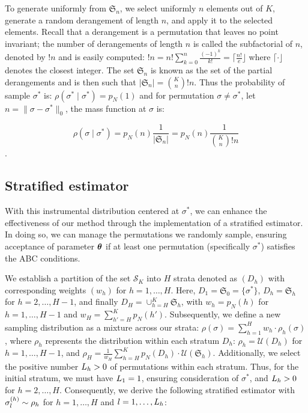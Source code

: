 To generate uniformly from $\mathfrak S_n$, we select uniformly $n$ elements out of $K$, generate a random derangement of length $n$, and apply it to the selected elements. Recall that a derangement is a permutation that leaves no point invariant; the number of derangements of length $n$ is called the subfactorial of $n$, denoted by $!n$ and is easily computed: $!n = n! \sum_{k=0}^n \frac{(-1)^k}{k!} = \lceil \frac{n!}{e} \rfloor$ where $\lceil \cdot \rfloor$ denotes the closest integer.
The set $\mathfrak{S}_n$ is known as the set of the partial derangements and is then such that $\lvert \mathfrak S_n \rvert = \binom{K}{n} !n$. 
Thus the probability of sample $\sigma^*$ is: $\rho(\sigma^*\mid \sigma^*) = p_N(1)$ and for  permutation $\sigma \neq \sigma^*$, let $n = \lVert\sigma - \sigma^*\rVert_0$,  the mass function at $\sigma$ is:

$$\rho(\sigma\mid\sigma^*) = p_N(n)\frac{1}{\lvert \mathfrak{S}_n \rvert} = p_N(n)\frac{1}{\binom{K}{n}!n}$$.

\subsection{Stratified estimator}
\label{appendix_secstrat}
With this instrumental distribution centered at $\sigma^*$, we can enhance the effectiveness of our method through the implementation of a stratified estimator. In doing so, we can manage the permutations we randomly sample, ensuring acceptance of parameter $\boldsymbol{\theta}$ if at least one permutation (specifically $\sigma^*$) satisfies the ABC conditions.

We establish a partition of the set $\mathcal S_K$ into $H$ strata denoted as $(D_h)$ with corresponding weights $(w_h)$ for $h=1,\dots,H$. Here, $D_1 = \mathfrak S_0 = \{ \sigma^* \}$, $D_h = \mathfrak S_h$ for $h = 2,\dots,H-1$, and finally $D_H = \cup_{h=H}^K \mathfrak S_h$, with $w_h = p_N(h)$ for $h=1,\dots,H-1$ and $w_H = \sum_{h'=H}^K p_N(h')$. Subsequently, we define a new sampling distribution as a mixture across our strata: $\rho(\sigma)= \sum_{h=1}^H w_h \cdot \rho_h(\sigma)$, where $\rho_h$ represents the distribution within each stratum $D_h$: $\rho_h = \mathcal U(D_h)$ for $h=1,\dots,H-1$, and $\rho_H = \frac{1}{w_H}\sum_{h=H}^K p_N(D_h)\cdot \mathcal U(\mathfrak S_h)$. Additionally, we select the positive number $L_{h}>0$ of permutations within each stratum. Thus, for the initial stratum, we must have $L_{1} = 1$, ensuring consideration of $\sigma^*$, and $L_{h}>0$ for $h=2,\dots,H$. Consequently, we derive the following stratified estimator with $\sigma_{l}^{(h)} \sim \rho_h$ for $h=1,\dots,H$ and $l=1,\dots,L_{h}$:

